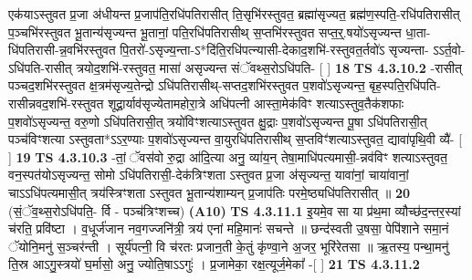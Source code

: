 \documentclass[17pt]{extarticle}
\begin{document}
                  एक॑याऽस्तुवत प्र॒जा अ॑धीयन्त प्र॒जाप॑ति॒रधि॑पतिरासीत् ति॒सृभि॑रस्तुवत॒ ब्रह्मा॑सृज्यत॒ ब्रह्म॑ण॒स्पति॒-रधि॑पतिरासीत् प॒ञ्चभि॑रस्तुवत भू॒तान्य॑सृज्यन्त भू॒तानां॒ पति॒रधि॑पतिरासीथ् स॒प्तभि॑रस्तुवत सप्त॒र्॒.षयो॑ऽसृज्यन्त धा॒ता-धि॑पतिरासी-न्न॒वभि॑रस्तुवत पि॒तरो॑-ऽसृज्य॒न्ता-ऽ*दि॑ति॒रधि॑पत्न्यासी-देकाद॒शभि॑-रस्तुवत॒र्तवो॑ऽ सृज्यन्ता- ऽऽर्त॒वो-ऽधि॑पति-रासीत् त्रयोद॒शभि॑-रस्तुवत॒ मासा॑ असृज्यन्त संॅवथ्स॒रोऽधि॑पति- [  ] \textbf{  18} \newline
                  \newline
                                \textbf{ TS 4.3.10.2} \newline
                  -रासीत् पञ्चद॒शभि॑रस्तुवत क्ष॒त्रम॑सृज्य॒तेन्द्रो ऽधि॑पतिरासीथ्-सप्तद॒शभि॑रस्तुवत प॒शवो॑ऽसृज्यन्त॒ बृह॒स्पति॒रधि॑पति-रासीन्नवद॒शभि॑-रस्तुवत शूद्रा॒र्याव॑सृज्येतामहोरा॒त्रे अधि॑पत्नी आस्ता॒मेक॑विꣳ शत्याऽस्तुव॒तैक॑शफाः प॒शवो॑ऽसृज्यन्त॒ वरु॒णो ऽधि॑पतिरासी॒त् त्रयो॑विꣳशत्याऽस्तुवत क्षु॒द्राः प॒शवो॑ऽसृज्यन्त पू॒षा ऽधि॑पतिरासी॒त् पञ्च॑विꣳशत्या ऽस्तुवता*ऽऽर॒ण्याः प॒शवो॑ऽसृज्यन्त वा॒युरधि॑पतिरासीथ् स॒प्तविꣳ॑शत्याऽस्तुवत॒ द्यावा॑पृथि॒वी व्यै॑- [  ] \textbf{  19} \newline
                  \newline
                                \textbf{ TS 4.3.10.3} \newline
                  -तां॒ ॅवस॑वो रु॒द्रा आ॑दि॒त्या अनु॒ व्या॑य॒न् तेषा॒माधि॑पत्यमासी॒-न्नव॑विꣳ शत्याऽस्तुवत॒ वन॒स्पत॑योऽसृज्यन्त॒ सोमो ऽधि॑पतिरासी॒-देक॑त्रिꣳशता ऽस्तुवत प्र॒जा अ॑सृज्यन्त॒ यावा॑नां॒ चाया॑वानां॒ चाऽऽधि॑पत्यमासी॒त् त्रय॑स्त्रिꣳशता ऽस्तुवत भू॒तान्य॑शाम्यन् प्र॒जाप॑तिः परमे॒ष्ठ्यधि॑पतिरासीत् ॥ \textbf{  20} \newline
                  \newline
                      (सं॒ॅव॒थ्स॒रोऽधि॑पति॒- र्वि - पञ्च॑त्रिꣳशच्च)  \textbf{(A10)} \newline \newline
                                        \textbf{ TS 4.3.11.1} \newline
                  इ॒यमे॒व सा या प्र॑थ॒मा व्यौच्छ॑द॒न्तर॒स्यां च॑रति॒ प्रवि॑ष्टा । व॒धूर्ज॑जान नव॒गज्जनि॑त्री॒ त्रय॑ एनां महि॒मानः॑ सचन्ते ॥ छन्द॑स्वती उ॒षसा॒ पेपि॑शाने समा॒नं ॅयोनि॒मनु॑ स॒ञ्चर॑न्ती । सूर्य॑पत्नी॒ वि च॑रतः प्रजान॒ती के॒तुं कृ॑ण्वा॒ने अ॒जर॒ भूरि॑रेतसा ॥ ऋ॒तस्य॒ पन्था॒मनु॑ ति॒स्र आऽगु॒स्त्रयो॑ घ॒र्मासो॒ अनु॒ ज्योति॒षाऽऽगुः॑ । प्र॒जामेका॒ रक्ष॒त्यूर्ज॒मेका᳚ -[  ] \textbf{  21} \newline
                  \newline
                                \textbf{ TS 4.3.11.2} \newline
\end{document}
